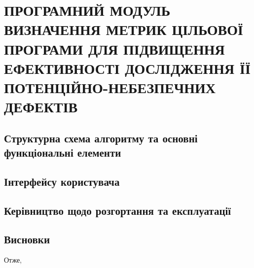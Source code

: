 \chapter{ПРОГРАМНИЙ МОДУЛЬ ВИЗНАЧЕННЯ МЕТРИК ЦІЛЬОВОЇ ПРОГРАМИ ДЛЯ ПІДВИЩЕННЯ ЕФЕКТИВНОСТІ ДОСЛІДЖЕННЯ ЇЇ ПОТЕНЦІЙНО-НЕБЕЗПЕЧНИХ ДЕФЕКТІВ}
\label{3section::doc}\label{3section:id1}

\section{Структурна схема алгоритму та основні функціональні елементи}
\label{3section:id2}

\section{Інтерфейсу користувача}
\label{3section:id3}

\section{Керівництво щодо розгортання та експлуатації}
\label{3section:id4}

\section*{Висновки}
Отже,
